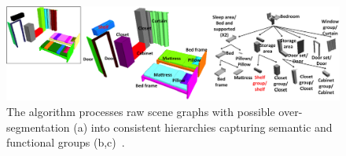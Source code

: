 
\begin{figure}[t] \centering
    \includegraphics[width=0.98\linewidth]{fig/img/liu_siga14_sh}
    \caption{
    The algorithm processes raw scene graphs with possible over-segmentation (a) into consistent hierarchies capturing semantic and functional groups (b,c)~\protect\cite{Liu:2014:CCS}.
    }
    \label{fig:liu_siga14_sh}
\end{figure}
